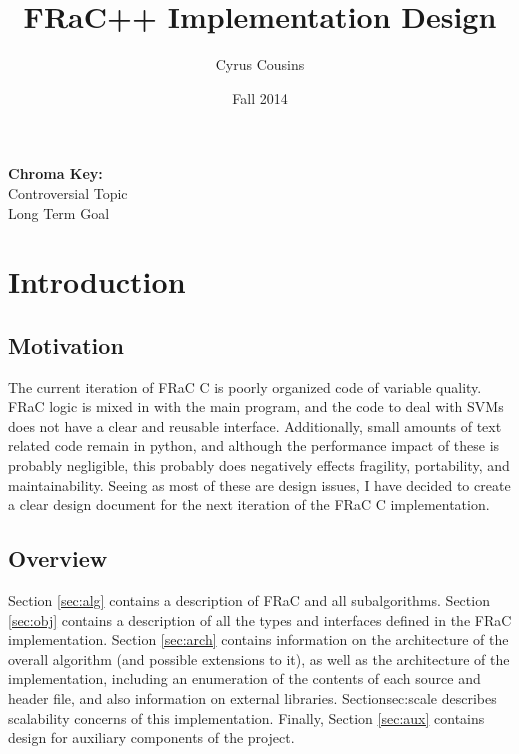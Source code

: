 \documentclass{article}
\title {FRaC++ Implementation Design}
\author{Cyrus Cousins}
\date{Fall 2014}
\newcommand{\CC}{C\nolinebreak\hspace{-.05em}\raisebox{.4ex}{\tiny\bf +}\nolinebreak\hspace{-.10em}\raisebox{.4ex}{\tiny\bf +}}
\begin{document}
\maketitle

\begin{multicols}{2}

\tableofcontents
\listoffigures
\par
\bigskip

\begin{framed}
\textbf{Chroma Key:} \\
\color{cont}Controversial Topic \\
\color{reach}Long Term Goal
\color{textcol}
\end{framed}

\end{multicols}

\pagebreak[3]

\section{Introduction}
\label{sec:intro}

\begin{multicols}{2}

\subsection{Motivation}

The current iteration of FRaC \CC{} is poorly organized code of variable quality.  FRaC logic is mixed in with the main program, and the code to deal with SVMs does not have a clear and reusable interface.  Additionally, small amounts of text related code remain in python, and although the performance impact of these is probably negligible, this probably does negatively effects fragility, portability, and maintainability.  Seeing as most of these are design issues, I have decided to create a clear design document for the next iteration of the FRaC \CC{} implementation.

\subsection{Overview}

Section \ref{sec:alg} contains a description of FRaC and all subalgorithms.  Section \ref{sec:obj} contains a description of all the types and interfaces defined in the FRa\CC{} implementation.  Section \ref{sec:arch} contains information on the architecture of the overall algorithm (and possible extensions to it), as well as the architecture of the implementation, including an enumeration of the contents of each source and header file, and also information on external libraries.  Section{sec:scale} describes scalability concerns of this implementation.  Finally, Section \ref{sec:aux} contains design for auxiliary components of the project.

\end{multicols}
\end{document}
